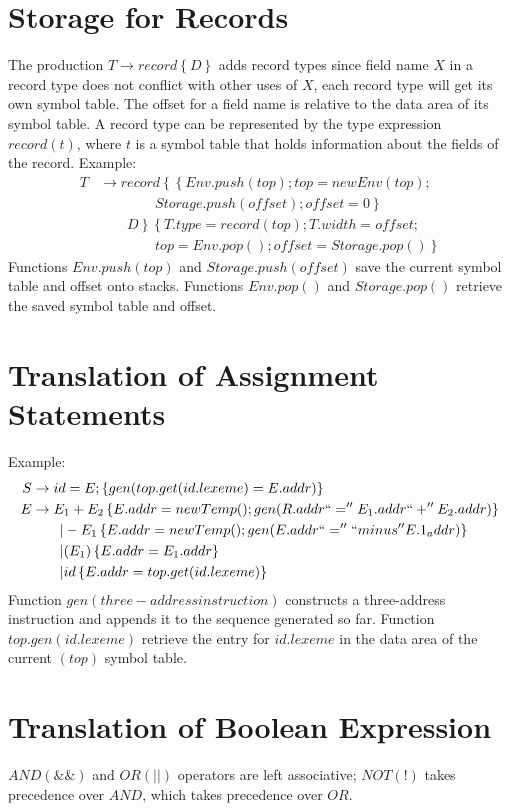 \section{Storage for Records}
The production $T \to record\left\{D\right\}$ adds record types since field name $X$ in a record type does not conflict with other uses of $X$, each record type will get its own symbol table.
The offset for a field name is relative to the data area of its symbol table.
A record type can be represented by the type expression $record(t)$, where $t$ is a symbol table that holds information about the fields of the record.
Example:
\begin{align*}
    T &\to record\left\{\left\{Env.push(top); top = new Env(top); \right.\right. \\
            &\qquad \qquad \left.\left. Storage.push(offset); offset = 0\right\} \right. \\
        &\qquad \left. D\right\} \left\{T.type = record(top); T.width = offset; \right. \\
            &\qquad \qquad \left. top = Env.pop(); offset = Storage.pop()\right\}
\end{align*}
Functions $Env.push(top)$ and $Storage.push(offset)$ save the current symbol table and offset onto stacks.
Functions $Env.pop()$ and $Storage.pop()$ retrieve the saved symbol table and offset.

\section{Translation of Assignment Statements}
Example:
\begin{align*}
    S &\to id = E; \left\{gen(top.get(id.lexeme) = E.addr)\right\} \\
    E &\to E_1 + E_2 \left\{E.addr = new Temp(); gen(R.addr ``='' E_1.addr ``+'' E_2.addr)\right\} \\
    &\qquad| -E_1 \left\{E.addr = new Temp(); gen(E.addr ``='' ``minus'' E.1_addr)\right\} \\
    &\qquad| (E_1) \left\{E.addr = E_1.addr\right\} \\
    &\qquad| id \left\{E.addr = top.get(id.lexeme)\right\}
\end{align*}
Function $gen(three-address instruction)$ constructs a three-address instruction and appends it to the sequence generated so far.
Function $top.gen(id.lexeme)$ retrieve the entry for $id.lexeme$ in the data area of the current $(top)$ symbol table.

\section{Translation of Boolean Expression}
$AND(\&\&)$ and $OR(||)$ operators are left associative; $NOT(!)$ takes precedence over $AND$, which takes precedence over $OR$.

